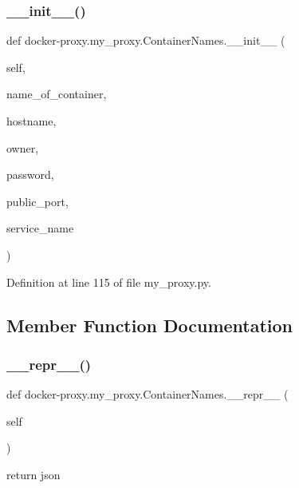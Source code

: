 \subsubsection{\texorpdfstring{\+\_\+\+\_\+init\+\_\+\+\_\+()}{\_\_init\_\_()}}
{\footnotesize\ttfamily def docker-\/proxy.\+my\+\_\+proxy.\+Container\+Names.\+\_\+\+\_\+init\+\_\+\+\_\+ (\begin{DoxyParamCaption}\item[{}]{self,  }\item[{}]{name\+\_\+of\+\_\+container,  }\item[{}]{hostname,  }\item[{}]{owner,  }\item[{}]{password,  }\item[{}]{public\+\_\+port,  }\item[{}]{service\+\_\+name }\end{DoxyParamCaption})}



Definition at line 115 of file my\+\_\+proxy.\+py.



\subsection{Member Function Documentation}
\hypertarget{classdocker-proxy_1_1my__proxy_1_1_container_names_a5bade0263a94bbfc7ffba0b4179ae27e}{}\label{classdocker-proxy_1_1my__proxy_1_1_container_names_a5bade0263a94bbfc7ffba0b4179ae27e} 
\subsubsection{\texorpdfstring{\+\_\+\+\_\+repr\+\_\+\+\_\+()}{\_\_repr\_\_()}}
{\footnotesize\ttfamily def docker-\/proxy.\+my\+\_\+proxy.\+Container\+Names.\+\_\+\+\_\+repr\+\_\+\+\_\+ (\begin{DoxyParamCaption}\item[{}]{self }\end{DoxyParamCaption})}

\begin{DoxyVerb}return json
\end{DoxyVerb}
 

